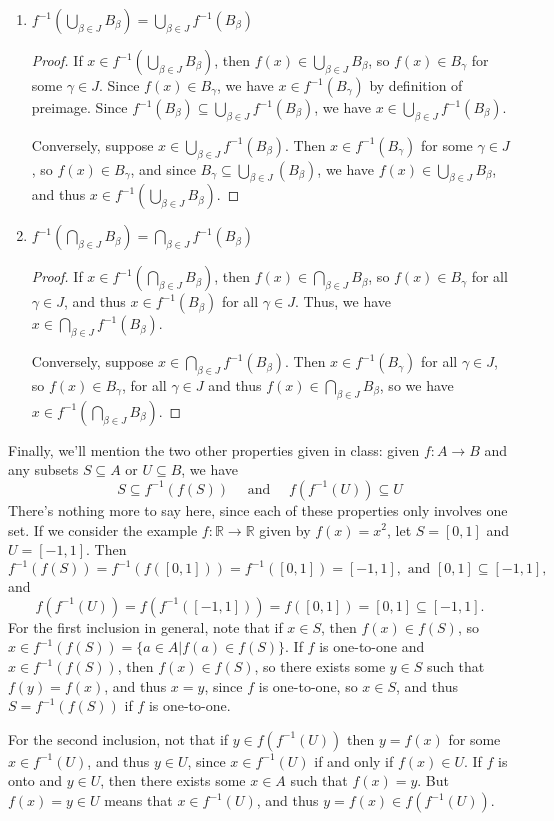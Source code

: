 \documentclass[letterpaper,12pt]{article}
\newcommand{\R}{\mathbb{R}}
\newcommand{\di}{\displaystyle}
\begin{document}
\begin{enumerate}
 \item $\di f^{-1}\left(\bigcup_{\beta\in J}B_\beta\right) = \bigcup_{\beta\in J}f^{-1}(B_\beta)$

\begin{proof}
 If $x\in f^{-1}\left(\bigcup_{\beta\in J}B_\beta\right)$, then $f(x)\in \bigcup_{\beta\in J}B_\beta$, so $f(x)\in B_\gamma$ for some $\gamma\in J$. Since $f(x)\in B_\gamma$, we have $x\in f^{-1}(B_\gamma)$ by definition of preimage. Since $f^{-1}(B_\beta)\subseteq \bigcup_{\beta\in J}f^{-1}(B_\beta)$, we have $x\in \bigcup_{\beta\in J}f^{-1}(B_\beta)$.

 Conversely, suppose $x\in \bigcup_{\beta\in J}f^{-1}(B_\beta)$. Then $x\in f^{-1}(B_\gamma)$ for some $\gamma\in J$, so $f(x)\in B_\gamma$, and since $B_\gamma\subseteq\bigcup_{\beta\in J}(B_\beta)$, we have $f(x)\in \bigcup_{\beta\in J}B_\beta$, and thus $x\in f^{-1}\left(\bigcup_{\beta\in J}B_\beta\right)$.
\end{proof}

 \item $\di f^{-1}\left(\bigcap_{\beta\in J}B_\beta\right) = \bigcap_{\beta\in J}f^{-1}(B_\beta)$

\begin{proof}
 If $x\in f^{-1}\left(\bigcap_{\beta\in J}B_\beta\right)$, then $f(x)\in \bigcap_{\beta\in J}B_\beta$, so $f(x)\in B_\gamma$ for all $\gamma\in J$, and thus $x\in f^{-1}(B_\beta)$ for all $\gamma\in J$. Thus, we have $x\in \bigcap_{\beta\in J}f^{-1}(B_\beta)$.

 Conversely, suppose $x\in \bigcap_{\beta\in J}f^{-1}(B_\beta)$. Then $x\in f^{-1}(B_\gamma)$ for all $\gamma\in J$, so $f(x)\in B_\gamma$, for all $\gamma\in J$ and thus $f(x)\in \bigcap_{\beta\in J}B_\beta$, so we have $x\in f^{-1}\left(\bigcap_{\beta\in J}B_\beta\right)$.
\end{proof}

\end{enumerate}
Finally, we'll mention the two other properties given in class: given $f:A\to B$ and any subsets $S\subseteq A$ or $U\subseteq B$, we have
\[
 S\subseteq f^{-1}(f(S)) \quad \text{ and } \quad f(f^{-1}(U))\subseteq U
\]
There's nothing more to say here, since each of these properties only involves one set. If we consider the example $f:\R\to\R$ given by $f(x)=x^2$, let $S=[0,1]$ and $U=[-1,1]$. Then
\[
 f^{-1}(f(S)) = f^{-1}(f([0,1])) = f^{-1}([0,1]) = [-1,1],\text{ and } [0,1]\subseteq [-1,1],
\]
and
\[
 f(f^{-1}(U))=f(f^{-1}([-1,1])) = f([0,1]) = [0,1] \subseteq [-1,1].
\]
For the first inclusion in general, note that if $x\in S$, then $f(x)\in f(S)$, so $x\in f^{-1}(f(S)) = \{a\in A|f(a)\in f(S)\}$. If $f$ is one-to-one and $x\in f^{-1}(f(S))$, then $f(x)\in f(S)$, so there exists some $y\in S$ such that $f(y)=f(x)$, and thus $x=y$, since $f$ is one-to-one, so $x\in S$, and thus $S=f^{-1}(f(S))$ if $f$ is one-to-one.

For the second inclusion, not that if $y\in f(f^{-1}(U))$ then $y=f(x)$ for some $x\in f^{-1}(U)$, and thus $y\in U$, since $x\in f^{-1}(U)$ if and only if $f(x)\in U$. If $f$ is onto and $y\in U$, then there exists some $x\in A$ such that $f(x)=y$. But $f(x)=y\in U$ means that $x\in f^{-1}(U)$, and thus $y=f(x)\in f(f^{-1}(U))$.
\end{document}
